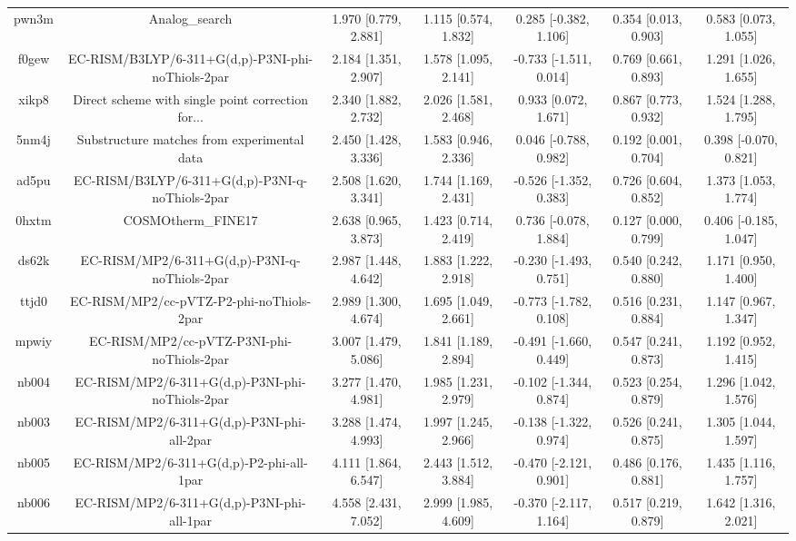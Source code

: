 \documentclass{article}
\begin{document}
\begin{center}
\begin{longtable}{|ccccccc|}
 pwn3m &                                     Analog\_search &  1.970 [0.779, 2.881] &  1.115 [0.574, 1.832] &    0.285 [-0.382, 1.106] &  0.354 [0.013, 0.903] &   0.583 [0.073, 1.055] \\
 f0gew &  EC-RISM/B3LYP/6-311+G(d,p)-P3NI-phi-noThiols-2par &  2.184 [1.351, 2.907] &  1.578 [1.095, 2.141] &   -0.733 [-1.511, 0.014] &  0.769 [0.661, 0.893] &   1.291 [1.026, 1.655] \\
 xikp8 &  Direct scheme with single point correction for... &  2.340 [1.882, 2.732] &  2.026 [1.581, 2.468] &     0.933 [0.072, 1.671] &  0.867 [0.773, 0.932] &   1.524 [1.288, 1.795] \\
 5nm4j &        Substructure matches from experimental data &  2.450 [1.428, 3.336] &  1.583 [0.946, 2.336] &    0.046 [-0.788, 0.982] &  0.192 [0.001, 0.704] &  0.398 [-0.070, 0.821] \\
 ad5pu &    EC-RISM/B3LYP/6-311+G(d,p)-P3NI-q-noThiols-2par &  2.508 [1.620, 3.341] &  1.744 [1.169, 2.431] &   -0.526 [-1.352, 0.383] &  0.726 [0.604, 0.852] &   1.373 [1.053, 1.774] \\
 0hxtm &                                 COSMOtherm\_FINE17 &  2.638 [0.965, 3.873] &  1.423 [0.714, 2.419] &    0.736 [-0.078, 1.884] &  0.127 [0.000, 0.799] &  0.406 [-0.185, 1.047] \\
 ds62k &      EC-RISM/MP2/6-311+G(d,p)-P3NI-q-noThiols-2par &  2.987 [1.448, 4.642] &  1.883 [1.222, 2.918] &   -0.230 [-1.493, 0.751] &  0.540 [0.242, 0.880] &   1.171 [0.950, 1.400] \\
 ttjd0 &           EC-RISM/MP2/cc-pVTZ-P2-phi-noThiols-2par &  2.989 [1.300, 4.674] &  1.695 [1.049, 2.661] &   -0.773 [-1.782, 0.108] &  0.516 [0.231, 0.884] &   1.147 [0.967, 1.347] \\
 mpwiy &         EC-RISM/MP2/cc-pVTZ-P3NI-phi-noThiols-2par &  3.007 [1.479, 5.086] &  1.841 [1.189, 2.894] &   -0.491 [-1.660, 0.449] &  0.547 [0.241, 0.873] &   1.192 [0.952, 1.415] \\
 nb004 &    EC-RISM/MP2/6-311+G(d,p)-P3NI-phi-noThiols-2par &  3.277 [1.470, 4.981] &  1.985 [1.231, 2.979] &   -0.102 [-1.344, 0.874] &  0.523 [0.254, 0.879] &   1.296 [1.042, 1.576] \\
 nb003 &         EC-RISM/MP2/6-311+G(d,p)-P3NI-phi-all-2par &  3.288 [1.474, 4.993] &  1.997 [1.245, 2.966] &   -0.138 [-1.322, 0.974] &  0.526 [0.241, 0.875] &   1.305 [1.044, 1.597] \\
 nb005 &           EC-RISM/MP2/6-311+G(d,p)-P2-phi-all-1par &  4.111 [1.864, 6.547] &  2.443 [1.512, 3.884] &   -0.470 [-2.121, 0.901] &  0.486 [0.176, 0.881] &   1.435 [1.116, 1.757] \\
 nb006 &         EC-RISM/MP2/6-311+G(d,p)-P3NI-phi-all-1par &  4.558 [2.431, 7.052] &  2.999 [1.985, 4.609] &   -0.370 [-2.117, 1.164] &  0.517 [0.219, 0.879] &   1.642 [1.316, 2.021] \\
\end{longtable}
\end{center}
\end{document}
